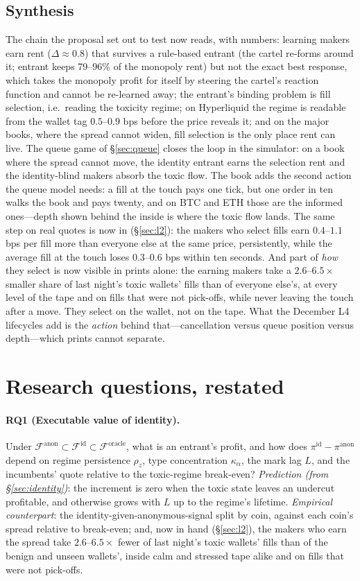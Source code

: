 \documentclass[11pt]{article}
\newcommand{\Fanon}{\mathcal{F}^{\mathrm{anon}}}
\newcommand{\Fid}{\mathcal{F}^{\mathrm{id}}}
\newcommand{\For}{\mathcal{F}^{\mathrm{oracle}}}
\begin{document}
\subsection{Synthesis}
The chain the proposal set out to test now reads, with numbers: learning makers earn rent ($\Delta\approx0.8$) that survives a rule-based entrant (the cartel re-forms around it; entrant keeps 79--96\% of the monopoly rent) but not the exact best response, which takes the monopoly profit for itself by steering the cartel's reaction function and cannot be re-learned away; the entrant's binding problem is fill selection, i.e.\ reading the toxicity regime; on Hyperliquid the regime is readable from the wallet tag $0.5$--$0.9$ bps before the price reveals it; and on the major books, where the spread cannot widen, fill selection is the only place rent can live. The queue game of \S\ref{sec:queue} closes the loop in the simulator: on a book where the spread cannot move, the identity entrant earns the selection rent and the identity-blind makers absorb the toxic flow. The book adds the second action the queue model needs: a fill at the touch pays one tick, but one order in ten walks the book and pays twenty, and on BTC and ETH those are the informed ones---depth shown behind the inside is where the toxic flow lands. The same step on real quotes is now in (\S\ref{sec:l2}): the makers who select fills earn $0.4$--$1.1$ bps per fill more than everyone else at the same price, persistently, while the average fill at the touch loses $0.3$--$0.6$ bps within ten seconds. And part of \emph{how} they select is now visible in prints alone: the earning makers take a $2.6$--$6.5\times$ smaller share of last night's toxic wallets' fills than of everyone else's, at every level of the tape and on fills that were not pick-offs, while never leaving the touch after a move. They select on the wallet, not on the tape. What the December L4 lifecycles add is the \emph{action} behind that---cancellation versus queue position versus depth---which prints cannot separate.

\section{Research questions, restated}
\paragraph{RQ1 (Executable value of identity).} Under $\Fanon\subset\Fid\subset\For$, what is an entrant's profit, and how does $\pi^{\mathrm{id}}-\pi^{\mathrm{anon}}$ depend on regime persistence $\rho_z$, type concentration $\kappa_\alpha$, the mark lag $L$, and the incumbents' quote relative to the toxic-regime break-even? \emph{Prediction (from \S\ref{sec:identity})}: the increment is zero when the toxic state leaves an undercut profitable, and otherwise grows with $L$ up to the regime's lifetime. \emph{Empirical counterpart}: the identity-given-anonymous-signal split by coin, against each coin's spread relative to break-even; and, now in hand (\S\ref{sec:l2}), the makers who earn the spread take $2.6$--$6.5\times$ fewer of last night's toxic wallets' fills than of the benign and unseen wallets', inside calm and stressed tape alike and on fills that were not pick-offs.
\end{document}
